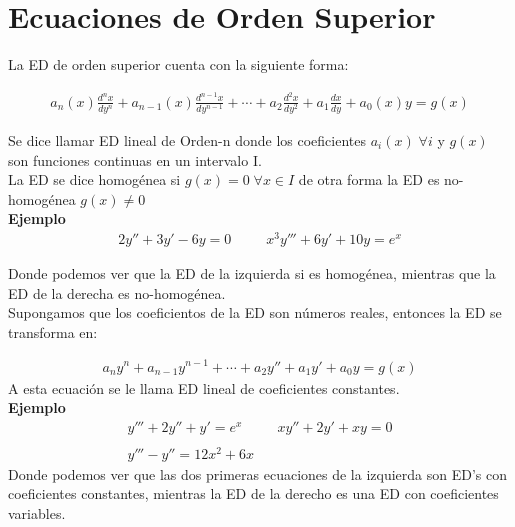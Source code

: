 \chapter{Ecuaciones de Orden Superior}

La ED de orden superior cuenta con la siguiente forma:

\begin{equation*}
    \begin{gathered}
        a_{n}(x)\frac{d^{n}x}{dy^{n}}+a_{n-1}(x)\frac{d^{n-1}x}{dy^{n-1}}+\cdots+a_{2}\frac{d^{2}x}{dy^{2}}+a_{1}\frac{dx}{dy}+a_{0}(x)y=g(x)
    \end{gathered}
\end{equation*}

Se dice llamar ED lineal de Orden-n donde los coeficientes \(\displaystyle a_{i}(x)\;\forall i\) y \(\displaystyle g(x)\) son funciones continuas en un intervalo I.\\
La ED se dice homogénea si \(\displaystyle g(x)=0\;\forall x\in I\) de otra forma la ED es no-homogénea \(\displaystyle g(x)\neq 0\)\\

\textbf{Ejemplo}\\

\begin{equation*}
  \begin{gathered}
    \displaystyle 2y''+3y'-6y=0\;\;\;\;\;\;\;\;\;x^{3}y'''+6y'+10y=e^{x}
  \end{gathered}
\end{equation*}

Donde podemos ver que la ED de la izquierda si es homogénea, mientras que la ED de la derecha es no-homogénea.\\

Supongamos que los coeficientos de la ED son números reales, entonces la ED se transforma en:

\begin{equation*}
    \begin{gathered}
        a_{n}y^{n}+a_{n-1}y^{n-1}+\cdots+a_{2}y''+a_{1}y'+a_{0}y=g(x)
    \end{gathered}
\end{equation*}
A esta ecuación se le llama ED lineal de coeficientes constantes.\\

\textbf{Ejemplo}\\

\begin{equation*}
  \begin{gathered}
    \displaystyle y'''+2y''+y'=e^{x}\;\;\;\;\;\;\;\;\;xy''+2y'+xy=0\\\\
    y'''-y''=12x^{2}+6x
  \end{gathered}
\end{equation*}
Donde podemos ver que las dos primeras ecuaciones de la izquierda son ED's con coeficientes constantes, mientras la ED de la derecho es una ED con coeficientes variables.

